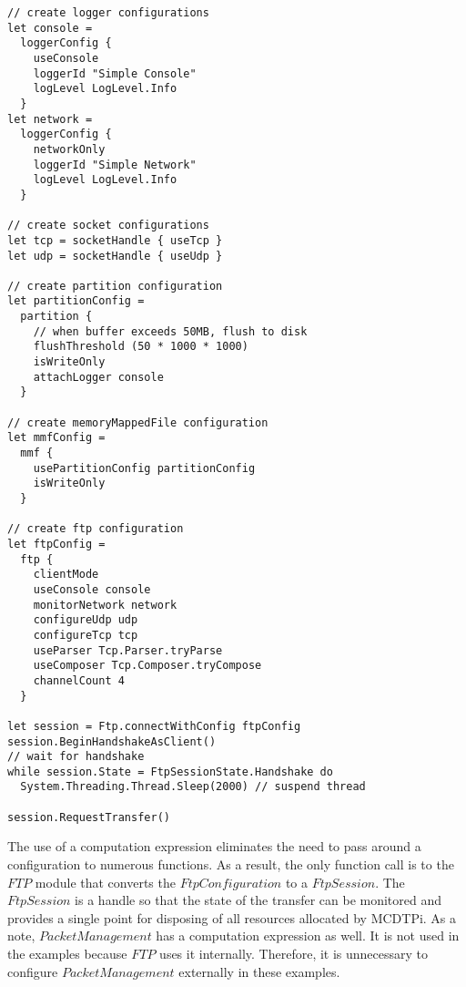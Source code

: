 \begin{lstlisting}[caption=Client Example]
// create logger configurations
let console =
  loggerConfig {
    useConsole
    loggerId "Simple Console"
    logLevel LogLevel.Info
  }
let network =
  loggerConfig {
    networkOnly
    loggerId "Simple Network"
    logLevel LogLevel.Info
  }

// create socket configurations
let tcp = socketHandle { useTcp }
let udp = socketHandle { useUdp }

// create partition configuration
let partitionConfig =
  partition {
    // when buffer exceeds 50MB, flush to disk
    flushThreshold (50 * 1000 * 1000)
    isWriteOnly
    attachLogger console
  }

// create memoryMappedFile configuration
let mmfConfig =
  mmf {
    usePartitionConfig partitionConfig
    isWriteOnly
  }

// create ftp configuration
let ftpConfig =
  ftp {
    clientMode
    useConsole console
    monitorNetwork network
    configureUdp udp
    configureTcp tcp
    useParser Tcp.Parser.tryParse
    useComposer Tcp.Composer.tryCompose
    channelCount 4
  }

let session = Ftp.connectWithConfig ftpConfig
session.BeginHandshakeAsClient()
// wait for handshake
while session.State = FtpSessionState.Handshake do
  System.Threading.Thread.Sleep(2000) // suspend thread

session.RequestTransfer()

\end{lstlisting}

The use of a computation expression eliminates the need to pass around a configuration to numerous functions. As a result, the only function call is to the $FTP$ module that converts the $FtpConfiguration$ to a $FtpSession$. The $FtpSession$ is a handle so that the state of the transfer can be monitored and provides a single point for disposing of all resources allocated by MCDTPi. As a note, $PacketManagement$ has a computation expression as well. It is not used in the examples because $FTP$ uses it internally. Therefore, it is unnecessary to configure $PacketManagement$ externally in these examples.